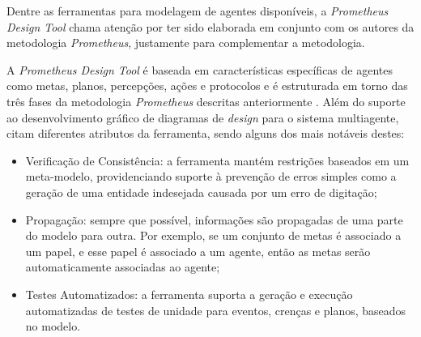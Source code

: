 Dentre as ferramentas para modelagem de agentes disponíveis, a \emph{Prometheus Design Tool} \cite{pdt} chama atenção por ter sido elaborada em conjunto com os autores da metodologia \emph{Prometheus}, justamente para complementar a metodologia.

A \emph{Prometheus Design Tool} é baseada em características específicas de agentes como metas, planos, percepções, ações e protocolos e é estruturada em torno das três fases da metodologia \emph{Prometheus} descritas anteriormente \cite{pdt}. Além do suporte ao desenvolvimento gráfico de diagramas de \emph{design} para o sistema multiagente,  citam diferentes atributos da ferramenta, sendo alguns dos mais notáveis destes:

\begin{itemize}
  \item Verificação de Consistência: a ferramenta mantém restrições baseados em um meta-modelo, providenciando suporte à prevenção de erros simples como a geração de uma entidade indesejada causada por um erro de digitação;
  \item Propagação: sempre que possível, informações são propagadas de uma parte do modelo para outra. Por exemplo, se um conjunto de metas é associado a um papel, e esse papel é associado a um agente, então as metas serão automaticamente associadas ao agente;
  \item Testes Automatizados: a ferramenta suporta a geração e execução automatizadas de testes de unidade para eventos, crenças e planos, baseados no modelo.
\end{itemize}
